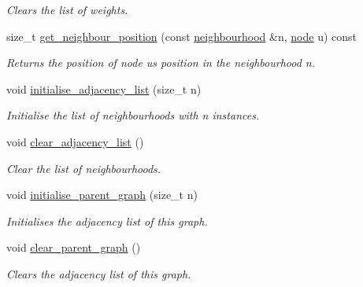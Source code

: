 \begin{DoxyCompactItemize}
\begin{DoxyCompactList}\small\item\em Clears the list of weights. \end{DoxyCompactList}\item 
size\+\_\+t \hyperlink{classlgraph_1_1utils_1_1xxgraph_aac7ef2134cad9529869f1334de7892d9}{get\+\_\+neighbour\+\_\+position} (const \hyperlink{namespacelgraph_1_1utils_a0f2ef47028a466d26841709e705390ac}{neighbourhood} \&n, \hyperlink{namespacelgraph_1_1utils_a7bd66ede3805ef121bc2835bd48de0cf}{node} u) const 
\begin{DoxyCompactList}\small\item\em Returns the position of node {\itshape u\textquotesingle{}s} position in the neighbourhood {\itshape n}. \end{DoxyCompactList}\item 
void \hyperlink{classlgraph_1_1utils_1_1xxgraph_a2201aaff5e9ffa29a9b3abfde705dd46}{initialise\+\_\+adjacency\+\_\+list} (size\+\_\+t n)\hypertarget{classlgraph_1_1utils_1_1xxgraph_a2201aaff5e9ffa29a9b3abfde705dd46}{}\label{classlgraph_1_1utils_1_1xxgraph_a2201aaff5e9ffa29a9b3abfde705dd46}

\begin{DoxyCompactList}\small\item\em Initialise the list of neighbourhoods with {\itshape n} instances. \end{DoxyCompactList}\item 
void \hyperlink{classlgraph_1_1utils_1_1xxgraph_a6523402d0ec66918b95de23d2bee38fc}{clear\+\_\+adjacency\+\_\+list} ()\hypertarget{classlgraph_1_1utils_1_1xxgraph_a6523402d0ec66918b95de23d2bee38fc}{}\label{classlgraph_1_1utils_1_1xxgraph_a6523402d0ec66918b95de23d2bee38fc}

\begin{DoxyCompactList}\small\item\em Clear the list of neighbourhoods. \end{DoxyCompactList}\item 
void \hyperlink{classlgraph_1_1utils_1_1xxgraph_abd983125be7f2f2b9c812326a4a39e6d}{initialise\+\_\+parent\+\_\+graph} (size\+\_\+t n)
\begin{DoxyCompactList}\small\item\em Initialises the adjacency list of this graph. \end{DoxyCompactList}\item 
void \hyperlink{classlgraph_1_1utils_1_1xxgraph_a8d213a8dfe716d344dd51d1bd37c0e2c}{clear\+\_\+parent\+\_\+graph} ()
\begin{DoxyCompactList}\small\item\em Clears the adjacency list of this graph. \end{DoxyCompactList}\end{DoxyCompactItemize}
